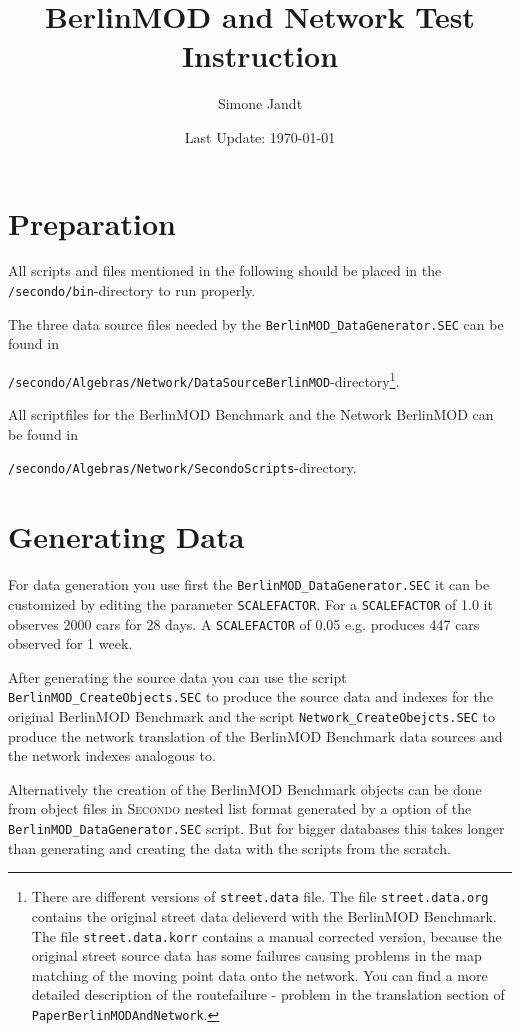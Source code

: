 \documentclass[a4paper,10pt]{article}
\title{BerlinMOD and Network Test Instruction}
\author{Simone Jandt}
\date{Last Update: \today}
\newcommand{\secondo}{\textsc{Secondo}}
\newcommand{\file}[1]{\texttt{#1}}
\begin{document}
\maketitle
\section{Preparation}
All scripts and files mentioned in the following should be placed in the \file{/secondo/bin}-directory to run properly.

The three data source files needed by the \file{BerlinMOD\_DataGenerator.SEC} can be found in 

\file{/secondo/Algebras/Network/DataSourceBerlinMOD}-directory\footnote{There are different versions of \file{street.data} file. The file \file{street.data.org} contains the original street data delieverd with the BerlinMOD Benchmark. The file \file{street.data.korr} contains a manual corrected version, because the original street source data has some failures causing problems in the map matching of the moving point data onto the network. You can find a more detailed description of the routefailure - problem in the translation section of \file{PaperBerlinMODAndNetwork}.}.
 
All scriptfiles for the BerlinMOD Benchmark and the Network BerlinMOD can be found in 
 
\file{/secondo/Algebras/Network/SecondoScripts}-directory.

\section{Generating Data}
For data generation you use first the \file{BerlinMOD\_DataGenerator.SEC} it can be customized by editing the parameter \file{SCALEFACTOR}. For a \file{SCALEFACTOR} of 1.0 it observes 2000 cars for 28 days. A \file{SCALEFACTOR} of 0.05 e.g. produces 447 cars observed for 1 week. 

After generating the source data you can use the script \file{BerlinMOD\_CreateObjects.SEC} to produce the source data and indexes for the original BerlinMOD Benchmark and the script \file{Network\_CreateObejcts.SEC} to produce the network translation of the BerlinMOD Benchmark data sources and the network indexes analogous to.

Alternatively the creation of the BerlinMOD Benchmark objects can be done from object files in \secondo{} nested list format generated by a option of the \file{BerlinMOD\_DataGenerator.SEC} script. But for bigger databases this takes longer than generating and creating the data with the scripts from the scratch.
\end{document}
